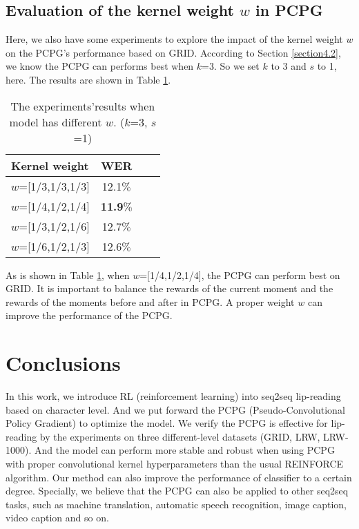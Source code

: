 \documentclass{bmvc2k}
\begin{document}
	\subsection{Evaluation of the kernel weight $w$ in PCPG}
	\vspace{-0.2cm}
	Here, we also have some experiments to explore the impact of the kernel weight $w$ on the PCPG's performance based on GRID. According to Section \ref{section4.2}, we know the PCPG can performs best when $k$=3. So we set $k$ to 3 and $s$ to 1, here. The results are shown in Table \ref{table3}.
	\begin{table}[H]
		\centering
		\vspace{-0.4cm}  %
		\setlength{\abovecaptionskip}{-0.00cm}   %
		\setlength{\belowcaptionskip}{-0.4cm}
		\begin{tabular}{lccr}    
			\hline
			\hline
			Kernel weight&     WER   \\
			\hline
			$w$=[1/3,1/3,1/3]& 12.1$\%$\\
			$w$=[1/4,1/2,1/4]&\textbf{11.9$\%$} \\
			$w$=[1/3,1/2,1/6]&12.7$\%$ \\
			$w$=[1/6,1/2,1/3]&12.6$\%$ \\  
			\hline
			\hline
		\end{tabular}
		\caption{The experiments'results when model has different $w$. ($k$=3, $s$=1)} \label{table3}
	\end{table}
	As is shown in Table \ref{table3}, when $w$=[1/4,1/2,1/4], the PCPG can perform best on GRID. It is important to balance the rewards of the current moment and the rewards of the moments before and after in PCPG. A proper weight $w$ can improve the performance of the PCPG.
	\vspace{-0.5cm}
	\section{Conclusions}
	\vspace{-0.4cm}
	In this work, we introduce RL (reinforcement learning) into seq2seq lip-reading based on character level. And we put forward the PCPG (Pseudo-Convolutional Policy Gradient) to optimize the model. We verify the PCPG is effective for lip-reading by the experiments on three different-level datasets (GRID, LRW, LRW-1000). And the model can perform more stable and robust when using PCPG with proper convolutional kernel hyperparameters than the usual REINFORCE algorithm. Our method can also improve the performance of classifier to a certain degree. Specially, we believe that the PCPG can also be applied to other seq2seq tasks, such as machine translation, automatic speech recognition, image caption, video caption and so on.
	
	
\end{document}
